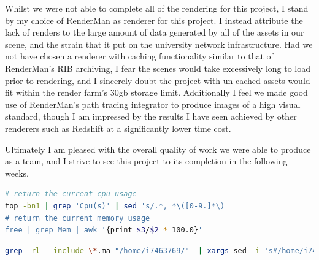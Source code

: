 \documentclass[11pt]{article}
\begin{document}
Whilst we were not able to complete all of the rendering for this project, I stand by my choice of RenderMan as renderer for this project. I instead attribute the lack of renders to the large amount of data generated by all of the assets in our scene, and the strain that it put on the university network infrastructure. Had we not have chosen a renderer with caching functionality similar to that of RenderMan's RIB archiving, I fear the scenes would take excessively long to load prior to rendering, and I sincerely doubt the project with un-cached assets would fit within the render farm's 30gb storage limit. Additionally I feel we made good use of RenderMan's path tracing integrator to produce images of a high visual standard, though I am impressed by the results I have seen achieved by other renderers such as Redshift at a significantly lower time cost.

Ultimately I am pleased with the overall quality of work we were able to produce as a team, and I strive to see this project to its completion in the following weeks.

\newpage




\newpage
\appendix

\begin{lstlisting}[language=bash, label={lst:cpumem}, caption={Extract from the Python script used to determine which of the computers on the university network are suitable for rendering on. By capturing the output of the following commands I was able to get the current CPU and memory usage.}]
# return the current cpu usage
top -bn1 | grep 'Cpu(s)' | sed 's/.*, *\([0-9.]*\)
# return the current memory usage
free | grep Mem | awk '{print $3/$2 * 100.0}'
\end{lstlisting}

\begin{lstlisting}[language=bash, label={lst:grep}, caption={The bash script used to replace any absolute paths in Maya scene files, and replace them with file paths suitable for use on the render farm. (Modified from this StackOverflow thread~\cite{stackoverflow})}]
grep -rl --include \*.ma "/home/i7463769/"  | xargs sed -i 's#/home/i7463769/#/render/i7463769/#g'
\end{lstlisting}
\end{document}
